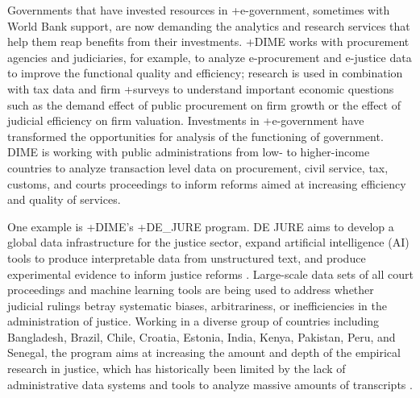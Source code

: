 \documentclass[
]{WileySix}
\begin{document}
Governments that have invested resources in +e-government\textbar, sometimes with World Bank support, are now demanding the analytics and research services that help them reap benefits from their investments. +DIME\textbar{} works with procurement agencies and judiciaries, for example, to analyze e-procurement and e-justice data to improve the functional quality and efficiency; research is used in combination with tax data and firm +surveys\textbar{} to understand important economic questions such as the demand effect of public procurement on firm growth or the effect of judicial efficiency on firm valuation. Investments in +e-government\textbar{} have transformed the opportunities for analysis of the functioning of government. DIME is working with public administrations from low- to higher-income countries to analyze transaction level data on procurement, civil service, tax, customs, and courts proceedings to inform reforms aimed at increasing efficiency and quality of services.

One example is +DIME's\textbar{} +DE\_JURE\textbar{} program. DE JURE aims to develop a global data infrastructure for the justice sector, expand artificial intelligence (AI) tools to produce interpretable data from unstructured text, and produce experimental evidence to inform justice reforms \citep{ash2018}. Large-scale data sets of all court proceedings and machine learning tools are being used to address whether judicial rulings betray systematic biases, arbitrariness, or inefficiencies in the administration of justice\emph{.} Working in a diverse group of countries including Bangladesh, Brazil, Chile, Croatia, Estonia, India, Kenya, Pakistan, Peru, and Senegal, the program aims at increasing the amount and depth of the empirical research in justice, which has historically been limited by the lack of administrative data systems and tools to analyze massive amounts of transcripts \citep[see][]{kondylis2019}.
\end{document}
